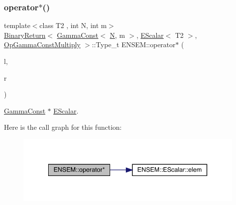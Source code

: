 \subsubsection{\texorpdfstring{operator$\ast$()}{operator*()}\hspace{0.1cm}{\footnotesize\ttfamily [2/9]}}
{\footnotesize\ttfamily template$<$class T2 , int N, int m$>$ \\
\mbox{\hyperlink{structENSEM_1_1BinaryReturn}{Binary\+Return}}$<$ \mbox{\hyperlink{classENSEM_1_1GammaConst}{Gamma\+Const}}$<$ \mbox{\hyperlink{adat__devel_2lib_2hadron_2operator__name__util_8cc_a7722c8ecbb62d99aee7ce68b1752f337}{N}}, m $>$, \mbox{\hyperlink{classENSEM_1_1EScalar}{E\+Scalar}}$<$ T2 $>$, \mbox{\hyperlink{structENSEM_1_1OpGammaConstMultiply}{Op\+Gamma\+Const\+Multiply}} $>$\+::Type\+\_\+t E\+N\+S\+E\+M\+::operator$\ast$ (\begin{DoxyParamCaption}\item[{const \mbox{\hyperlink{classENSEM_1_1GammaConst}{Gamma\+Const}}$<$ \mbox{\hyperlink{adat__devel_2lib_2hadron_2operator__name__util_8cc_a7722c8ecbb62d99aee7ce68b1752f337}{N}}, m $>$ \&}]{l,  }\item[{const \mbox{\hyperlink{classENSEM_1_1EScalar}{E\+Scalar}}$<$ T2 $>$ \&}]{r }\end{DoxyParamCaption})\hspace{0.3cm}{\ttfamily [inline]}}



\mbox{\hyperlink{classENSEM_1_1GammaConst}{Gamma\+Const}} $\ast$ \mbox{\hyperlink{classENSEM_1_1EScalar}{E\+Scalar}}. 

Here is the call graph for this function\+:
\nopagebreak
\begin{figure}[H]
\begin{center}
\leavevmode
\includegraphics[width=334pt]{d4/dca/group__escalar_gae8dabaf2e8ff409632f9943294b5a6b4_cgraph}
\end{center}
\end{figure}
\mbox{\label{group__escalar_ga10de70ea3b5491035fab4f67de013321}} 
